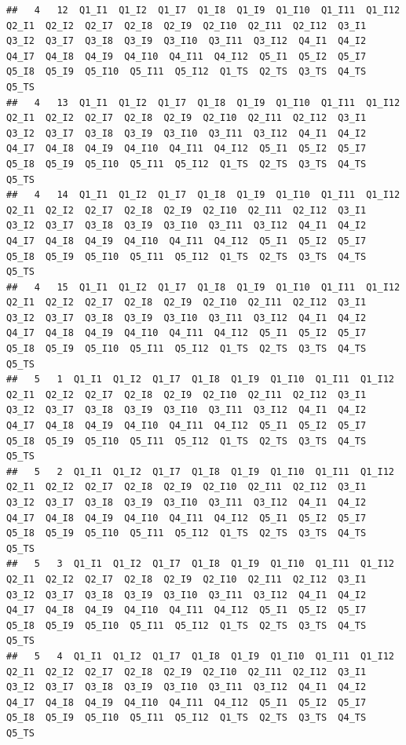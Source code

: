 \documentclass[]{book}
\begin{document}
\begin{verbatim}
##   4   12  Q1_I1  Q1_I2  Q1_I7  Q1_I8  Q1_I9  Q1_I10  Q1_I11  Q1_I12  Q2_I1  Q2_I2  Q2_I7  Q2_I8  Q2_I9  Q2_I10  Q2_I11  Q2_I12  Q3_I1  Q3_I2  Q3_I7  Q3_I8  Q3_I9  Q3_I10  Q3_I11  Q3_I12  Q4_I1  Q4_I2  Q4_I7  Q4_I8  Q4_I9  Q4_I10  Q4_I11  Q4_I12  Q5_I1  Q5_I2  Q5_I7  Q5_I8  Q5_I9  Q5_I10  Q5_I11  Q5_I12  Q1_TS  Q2_TS  Q3_TS  Q4_TS  Q5_TS
##   4   13  Q1_I1  Q1_I2  Q1_I7  Q1_I8  Q1_I9  Q1_I10  Q1_I11  Q1_I12  Q2_I1  Q2_I2  Q2_I7  Q2_I8  Q2_I9  Q2_I10  Q2_I11  Q2_I12  Q3_I1  Q3_I2  Q3_I7  Q3_I8  Q3_I9  Q3_I10  Q3_I11  Q3_I12  Q4_I1  Q4_I2  Q4_I7  Q4_I8  Q4_I9  Q4_I10  Q4_I11  Q4_I12  Q5_I1  Q5_I2  Q5_I7  Q5_I8  Q5_I9  Q5_I10  Q5_I11  Q5_I12  Q1_TS  Q2_TS  Q3_TS  Q4_TS  Q5_TS
##   4   14  Q1_I1  Q1_I2  Q1_I7  Q1_I8  Q1_I9  Q1_I10  Q1_I11  Q1_I12  Q2_I1  Q2_I2  Q2_I7  Q2_I8  Q2_I9  Q2_I10  Q2_I11  Q2_I12  Q3_I1  Q3_I2  Q3_I7  Q3_I8  Q3_I9  Q3_I10  Q3_I11  Q3_I12  Q4_I1  Q4_I2  Q4_I7  Q4_I8  Q4_I9  Q4_I10  Q4_I11  Q4_I12  Q5_I1  Q5_I2  Q5_I7  Q5_I8  Q5_I9  Q5_I10  Q5_I11  Q5_I12  Q1_TS  Q2_TS  Q3_TS  Q4_TS  Q5_TS
##   4   15  Q1_I1  Q1_I2  Q1_I7  Q1_I8  Q1_I9  Q1_I10  Q1_I11  Q1_I12  Q2_I1  Q2_I2  Q2_I7  Q2_I8  Q2_I9  Q2_I10  Q2_I11  Q2_I12  Q3_I1  Q3_I2  Q3_I7  Q3_I8  Q3_I9  Q3_I10  Q3_I11  Q3_I12  Q4_I1  Q4_I2  Q4_I7  Q4_I8  Q4_I9  Q4_I10  Q4_I11  Q4_I12  Q5_I1  Q5_I2  Q5_I7  Q5_I8  Q5_I9  Q5_I10  Q5_I11  Q5_I12  Q1_TS  Q2_TS  Q3_TS  Q4_TS  Q5_TS
##   5   1  Q1_I1  Q1_I2  Q1_I7  Q1_I8  Q1_I9  Q1_I10  Q1_I11  Q1_I12  Q2_I1  Q2_I2  Q2_I7  Q2_I8  Q2_I9  Q2_I10  Q2_I11  Q2_I12  Q3_I1  Q3_I2  Q3_I7  Q3_I8  Q3_I9  Q3_I10  Q3_I11  Q3_I12  Q4_I1  Q4_I2  Q4_I7  Q4_I8  Q4_I9  Q4_I10  Q4_I11  Q4_I12  Q5_I1  Q5_I2  Q5_I7  Q5_I8  Q5_I9  Q5_I10  Q5_I11  Q5_I12  Q1_TS  Q2_TS  Q3_TS  Q4_TS  Q5_TS
##   5   2  Q1_I1  Q1_I2  Q1_I7  Q1_I8  Q1_I9  Q1_I10  Q1_I11  Q1_I12  Q2_I1  Q2_I2  Q2_I7  Q2_I8  Q2_I9  Q2_I10  Q2_I11  Q2_I12  Q3_I1  Q3_I2  Q3_I7  Q3_I8  Q3_I9  Q3_I10  Q3_I11  Q3_I12  Q4_I1  Q4_I2  Q4_I7  Q4_I8  Q4_I9  Q4_I10  Q4_I11  Q4_I12  Q5_I1  Q5_I2  Q5_I7  Q5_I8  Q5_I9  Q5_I10  Q5_I11  Q5_I12  Q1_TS  Q2_TS  Q3_TS  Q4_TS  Q5_TS
##   5   3  Q1_I1  Q1_I2  Q1_I7  Q1_I8  Q1_I9  Q1_I10  Q1_I11  Q1_I12  Q2_I1  Q2_I2  Q2_I7  Q2_I8  Q2_I9  Q2_I10  Q2_I11  Q2_I12  Q3_I1  Q3_I2  Q3_I7  Q3_I8  Q3_I9  Q3_I10  Q3_I11  Q3_I12  Q4_I1  Q4_I2  Q4_I7  Q4_I8  Q4_I9  Q4_I10  Q4_I11  Q4_I12  Q5_I1  Q5_I2  Q5_I7  Q5_I8  Q5_I9  Q5_I10  Q5_I11  Q5_I12  Q1_TS  Q2_TS  Q3_TS  Q4_TS  Q5_TS
##   5   4  Q1_I1  Q1_I2  Q1_I7  Q1_I8  Q1_I9  Q1_I10  Q1_I11  Q1_I12  Q2_I1  Q2_I2  Q2_I7  Q2_I8  Q2_I9  Q2_I10  Q2_I11  Q2_I12  Q3_I1  Q3_I2  Q3_I7  Q3_I8  Q3_I9  Q3_I10  Q3_I11  Q3_I12  Q4_I1  Q4_I2  Q4_I7  Q4_I8  Q4_I9  Q4_I10  Q4_I11  Q4_I12  Q5_I1  Q5_I2  Q5_I7  Q5_I8  Q5_I9  Q5_I10  Q5_I11  Q5_I12  Q1_TS  Q2_TS  Q3_TS  Q4_TS  Q5_TS

\end{verbatim}
\end{document}
